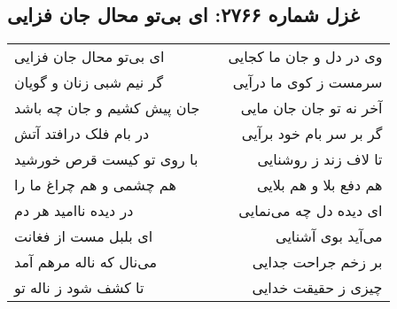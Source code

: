 \begin{center}
\section*{غزل شماره ۲۷۶۶: ای بی‌تو محال جان فزایی}
\label{sec:2766}
\begin{longtable}{l p{0.5cm} r}
ای بی‌تو محال جان فزایی
&&
وی در دل و جان ما کجایی
\\
گر نیم شبی زنان و گویان
&&
سرمست ز کوی ما درآیی
\\
جان پیش کشیم و جان چه باشد
&&
آخر نه تو جان جان مایی
\\
در بام فلک درافتد آتش
&&
گر بر سر بام خود برآیی
\\
با روی تو کیست قرص خورشید
&&
تا لاف زند ز روشنایی
\\
هم چشمی و هم چراغ ما را
&&
هم دفع بلا و هم بلایی
\\
در دیده ناامید هر دم
&&
ای دیده دل چه می‌نمایی
\\
ای بلبل مست از فغانت
&&
می‌آید بوی آشنایی
\\
می‌نال که ناله مرهم آمد
&&
بر زخم جراحت جدایی
\\
تا کشف شود ز ناله تو
&&
چیزی ز حقیقت خدایی
\\
\end{longtable}
\end{center}
